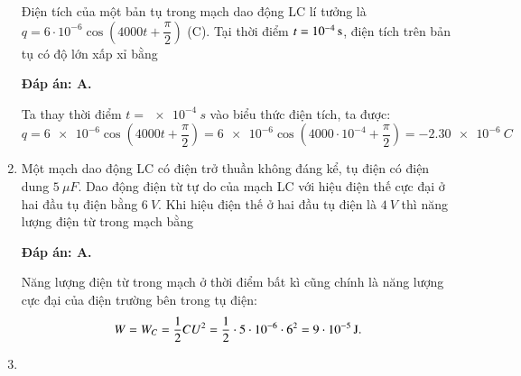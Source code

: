 \begin{enumerate}[label=\bfseries Câu \arabic*:]
	{Điện tích của một bản tụ trong mạch dao động LC lí tưởng là $q = 6\cdot10^{-6} \cos \left( 4000t + \dfrac{\pi}{2} \right)$ (C). Tại thời điểm $t = \xsi{10^{-4}}{s}$, điện tích trên bản tụ có độ lớn xấp xỉ bằng 
	}
	
	\hideall
	{		\textbf{Đáp án: A.}
		
		Ta thay thời điểm $t = \SI{e-4}{s}$ vào biểu thức điện tích, ta được:
		$$
		q = \num{6e-6} \cos \left( 4000t + \dfrac{\pi}{2} \right) = \num{6e-6}\cos \left( 4000\cdot10^{-4} + \dfrac{\pi}{2} \right) = -\SI{2,30 e-6}{C}
		$$
		
	}
	
	\item {}
	
	{Một mạch dao động LC có điện trở thuần không đáng kể, tụ điện có điện dung $\SI{5}{\mu F}$. Dao động điện từ tự do của mạch LC với hiệu điện thế cực đại ở hai đầu tụ điện bằng $\SI{6}{V}$. Khi hiệu điện thế ở hai đầu tụ điện là $\SI{4}{V}$ thì năng lượng điện từ trong mạch bằng
	}
	
	\hideall
	{		\textbf{Đáp án: A.}
		
		Năng lượng điện từ trong mạch ở thời điểm bất kì cũng chính là năng lượng cực đại của điện trường bên trong tụ điện:
		$$
		W = W_C = \dfrac{1}{2}CU^{2} = \dfrac{1}{2} \cdot 5\cdot10^{-6} \cdot 6^{2} = \xsi{9\cdot10^{-5}}{J}.
		$$
	}
	
		\item {}
	

\end{enumerate}
